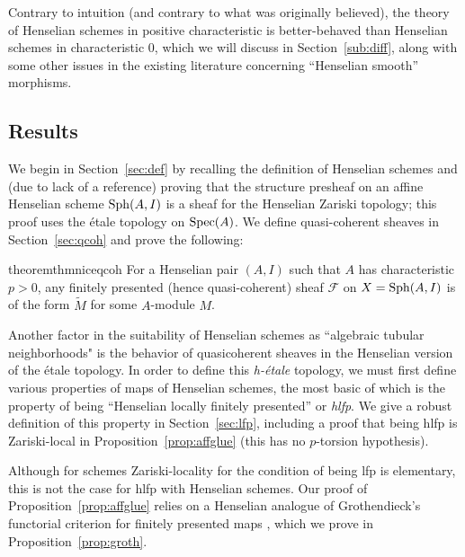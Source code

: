 \documentclass[12pt]{article}
\newcommand{\F}{\mathcal{F}}
\newcommand{\spec}{{\rm Spec}}
\newcommand{\sph}{{\rm Sph}}
\newcommand{\Et}{\'etale\xspace}
\newcommand{\hlfp}{hlfp\xspace}
\newcommand{\hetale}{h-\'etale\xspace}
\theoremstyle{definition}
\numberwithin{equation}{subsection}
\begin{document}
Contrary to intuition (and contrary to what was originally believed), the theory of Henselian schemes in positive characteristic is better-behaved than Henselian schemes in characteristic $0$, which we will discuss in Section~\ref{sub:diff}, along with some other issues in the existing literature concerning ``Henselian smooth'' morphisms. 


\subsection{Results}\label{sub:results}

We begin in Section~\ref{sec:def} by recalling the definition of Henselian schemes and (due to lack of a reference) proving that the structure presheaf on an affine Henselian scheme $\sph(A,I)$ is a sheaf for the Henselian Zariski topology; this proof uses the \Et topology on $\spec(A)$. We define quasi-coherent sheaves in Section~\ref{sec:qcoh} and prove the following:

\newcommand{\sphai}{\sph(A,I)}

\begin{restatable*}{theorem}{thmniceqcoh}\label{thm:niceqcoh} For a Henselian pair $(A,I)$ such that $A$ has characteristic $p>0$, any finitely presented (hence quasi-coherent) sheaf $\F$ on $X=\sphai$ is of the form $\widetilde{M}$ for some $A$-module $M$.  \end{restatable*}

Another factor in the suitability of Henselian schemes as ``algebraic tubular neighborhoods" \cite{cox1} is the behavior of quasicoherent sheaves in the Henselian version of the \Et topology. In order to define this {\it \hetale} topology, we must first define various properties of maps of Henselian schemes, the most basic of which is the property of being ``Henselian locally finitely presented'' or {\it \hlfp}. We give a robust definition of this property in Section~\ref{sec:lfp}, including a proof that being \hlfp is Zariski-local in Proposition~\ref{prop:affglue} (this has no $p$-torsion hypothesis). 

Although for schemes Zariski-locality for the condition of being lfp is elementary, this is not the case for \hlfp with Henselian schemes. Our proof of Proposition~\ref{prop:affglue} relies on a Henselian analogue of Grothendieck's functorial criterion for finitely presented maps \cite[Proposition 8.14.2]{ega41}, which we prove in Proposition~\ref{prop:groth}.
\end{document}
